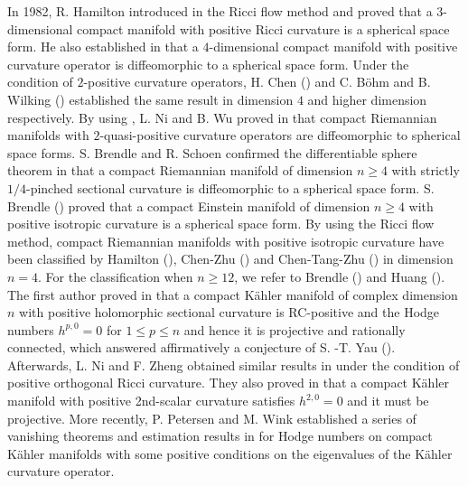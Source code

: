 \documentclass[12pt]{amsart}
\theoremstyle{plain}
\theoremstyle{definition}
\renewcommand{\>}{\rightarrow}
\numberwithin{equation}{section} %
\begin{document}
	In 1982, R.  Hamilton  introduced in \cite{Hamilton1982} the Ricci flow method and proved that a $3$-dimensional compact manifold with positive Ricci curvature is a spherical space form.   He  also established in \cite{Hamilton1986} that a $4$-dimensional compact manifold with positive curvature operator is diffeomorphic to a spherical space form. Under the condition of $2$-positive curvature operators, H. Chen (\cite{ChenH1991}) and C. B\"ohm and B. Wilking (\cite{BohmWilking2008}) established the same result in dimension $4$ and  higher dimension respectively. By using \cite{BohmWilking2008},   L. Ni and B. Wu proved in \cite{NiWu2007} that compact Riemannian manifolds with $2$-quasi-positive curvature operators are diffeomorphic to spherical space forms. S. Brendle and R. Schoen confirmed the differentiable sphere theorem in \cite{BrendleSchoen2009}  that a compact Riemannian manifold of dimension $n\geq4$ with strictly $1/4$-pinched sectional curvature is diffeomorphic to a spherical space form.  S. Brendle (\cite{Brendle2010}) proved that a compact Einstein manifold of dimension $n\geq4$ with positive isotropic curvature is a spherical space form. By using the Ricci flow method, compact Riemannian manifolds with positive isotropic curvature have been classified by Hamilton (\cite{Hamilton1997}), Chen-Zhu (\cite{ChenZhu2006}) and Chen-Tang-Zhu (\cite{ChenTangZhu2012}) in dimension $n = 4$. For  the classification when $n\geq 12$, we refer to  Brendle (\cite{Brendle2019}) and  Huang (\cite{Huang2023}).\\
	
	
	
	
	
	The first author proved in  \cite{Yang2018}  that a compact K\"ahler manifold of complex dimension $n$ with positive holomorphic sectional curvature is RC-positive and the Hodge numbers $h^{p,0}=0$ for $1\leq p\leq n$ and hence it is projective and rationally connected, which answered affirmatively a conjecture of S. -T. Yau (\cite[Problem~47]{yaup}). Afterwards, L. Ni and F. Zheng  obtained similar results in \cite{NiZheng20a} under the condition of positive orthogonal Ricci curvature. They also proved in \cite{NiZheng20b}  that a compact K\"ahler manifold with positive 2nd-scalar curvature satisfies $h^{2,0}=0$ and it must be projective. More recently, P. Petersen and M. Wink  established a series of vanishing theorems and estimation results in \cite{PetersenWink2021b} for Hodge numbers on compact K\"ahler manifolds with some positive conditions on the eigenvalues of the K\"ahler curvature operator.\\
	
\end{document}
